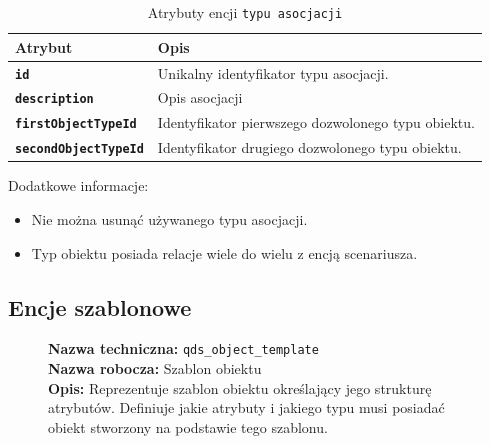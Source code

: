 \begin{table}[H]
    \centering
    \renewcommand{\arraystretch}{1.6}
    \begin{tabular}{|>{\bfseries}l|p{}|}
        \hline
        \rowcolor[HTML]{EFEFEF} \textbf{Atrybut} & \textbf{Opis} \\
        \hline
        \texttt{id} & Unikalny identyfikator typu asocjacji. \\
        \hline
        \texttt{description} & Opis asocjacji \\
        \hline
        \texttt{firstObjectTypeId} & Identyfikator pierwszego dozwolonego typu obiektu. \\
        \hline
        \texttt{secondObjectTypeId} & Identyfikator drugiego dozwolonego typu obiektu. \\
        \hline
    \end{tabular}
    \caption{Atrybuty encji \texttt{typu asocjacji}}
\end{table}

Dodatkowe informacje:
\begin{itemize}
    \item Nie można usunąć używanego typu asocjacji.
    \item Typ obiektu posiada relacje wiele do wielu z encją scenariusza.
\end{itemize}

\subsection{Encje szablonowe}

\begin{figure}[H]
    \centering
    \begin{minipage}{0.8\textwidth}
        \begin{framed}
            \noindent\textbf{\large Nazwa techniczna:} \texttt{qds\_object\_template} \\
            \textbf{\large Nazwa robocza:} Szablon obiektu \\
            \textbf{\large Opis:} Reprezentuje szablon obiektu określający jego strukturę atrybutów.
            Definiuje jakie atrybuty i jakiego typu musi posiadać obiekt stworzony na podstawie tego szablonu.
        \end{framed}
    \end{minipage}
\end{figure}

